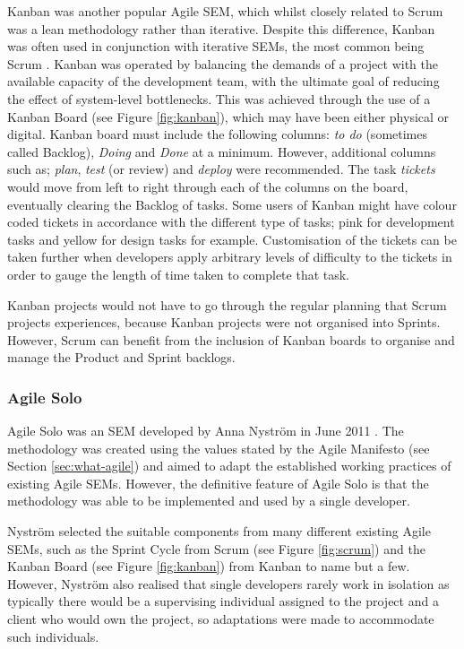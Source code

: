\documentclass[final]{cmpreport}
\begin{document}
			Kanban was another popular Agile SEM, which whilst closely related to Scrum was a lean methodology rather than iterative. Despite this difference, Kanban was often used in conjunction with iterative SEMs, the most common being Scrum \citep{kanban}. Kanban was operated by balancing the demands of a project with the available capacity of the development team, with the ultimate goal of reducing the effect of system-level bottlenecks. This was achieved through the use of a Kanban Board (see Figure \ref{fig:kanban}), which may have been either physical or digital. Kanban board must include the following columns: \emph{to do} (sometimes called Backlog), \emph{Doing} and \emph{Done} at a minimum. However, additional columns such as; \emph{plan}, \emph{test} (or review) and \emph{deploy} were recommended. The task \emph{tickets} would move from left to right through each of the columns on the board, eventually clearing the Backlog of tasks. Some users of Kanban might have colour coded tickets in accordance with the different type of tasks; pink for development tasks and yellow for design tasks for example. Customisation of the tickets can be taken further when developers apply arbitrary levels of difficulty to the tickets in order to gauge the length of time taken to complete that task. 
			
			Kanban projects would not have to go through the regular planning that Scrum projects experiences, because Kanban projects were not organised into Sprints. However, Scrum can benefit from the inclusion of Kanban boards to organise and manage the Product and Sprint backlogs.
			
			\subsubsection{Agile Solo} \label{sec:agile-solo}
			Agile Solo was an SEM developed by Anna Nystr{\"o}m in June 2011 \citep{AgileSolo}. The methodology was created using the values stated by the Agile Manifesto (see Section \ref{sec:what-agile}) and aimed to adapt the established working practices of existing Agile SEMs. However, the definitive feature of Agile Solo is that the methodology was able to be implemented and used by a single developer. 
			
			Nystr{\"o}m selected the suitable components from many different existing Agile SEMs, such as the Sprint Cycle from Scrum (see Figure \ref{fig:scrum}) and the Kanban Board (see Figure \ref{fig:kanban}) from Kanban to name but a few. However, Nystr{\"o}m also realised that single developers rarely work in isolation as typically there would be a supervising individual assigned to the project and a client who would own the project, so adaptations were made to accommodate such individuals.
			
\end{document}
